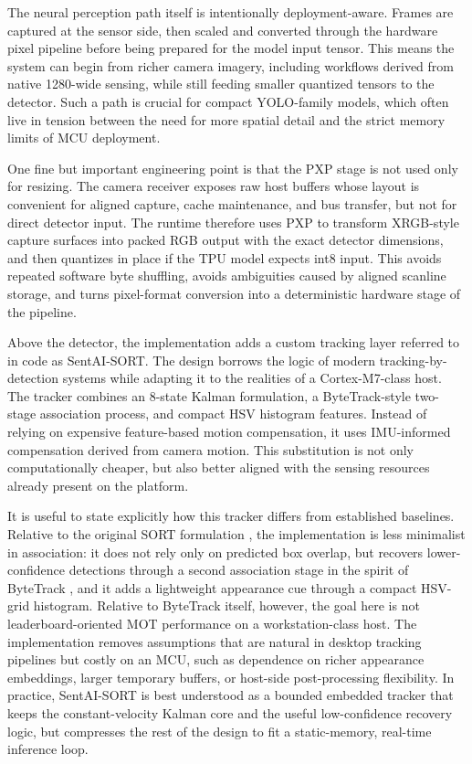 The neural perception path itself is intentionally deployment-aware.
Frames are captured at the sensor side, then scaled and converted
through the hardware pixel pipeline before being prepared for the model
input tensor. This means the system can begin from richer camera
imagery, including workflows derived from native 1280-wide sensing,
while still feeding smaller quantized tensors to the detector. Such a
path is crucial for compact YOLO-family models, which often live in
tension between the need for more spatial detail and the strict memory
limits of MCU deployment.

One fine but important engineering point is that the PXP stage is not
used only for resizing. The camera receiver exposes raw host buffers
whose layout is convenient for aligned capture, cache maintenance, and
bus transfer, but not for direct detector input. The runtime therefore
uses PXP to transform XRGB-style capture surfaces into packed RGB output
with the exact detector dimensions, and then quantizes in place if the
TPU model expects int8 input. This avoids repeated software byte
shuffling, avoids ambiguities caused by aligned scanline storage, and
turns pixel-format conversion into a deterministic hardware stage of the
pipeline.

Above the detector, the implementation adds a custom tracking layer
referred to in code as SentAI-SORT. The design borrows the logic of
modern tracking-by-detection systems while adapting it to the realities
of a Cortex-M7-class host. The tracker combines an 8-state Kalman
formulation, a ByteTrack-style two-stage association process, and
compact HSV histogram features. Instead of relying on expensive
feature-based motion compensation, it uses IMU-informed compensation
derived from camera motion. This substitution is not only
computationally cheaper, but also better aligned with the sensing
resources already present on the platform.

It is useful to state explicitly how this tracker differs from
established baselines. Relative to the original SORT formulation
\citep{Bewley2016}, the implementation is less minimalist in
association: it does not rely only on predicted box overlap, but
recovers lower-confidence detections through a second association stage
in the spirit of ByteTrack \citep{Zhang2022}, and it adds a lightweight
appearance cue through a compact HSV-grid histogram. Relative to
ByteTrack itself, however, the goal here is not leaderboard-oriented MOT
performance on a workstation-class host. The implementation removes
assumptions that are natural in desktop tracking pipelines but costly on
an MCU, such as dependence on richer appearance embeddings, larger
temporary buffers, or host-side post-processing flexibility. In
practice, SentAI-SORT is best understood as a bounded embedded tracker
that keeps the constant-velocity Kalman core and the useful
low-confidence recovery logic, but compresses the rest of the design to
fit a static-memory, real-time inference loop.

